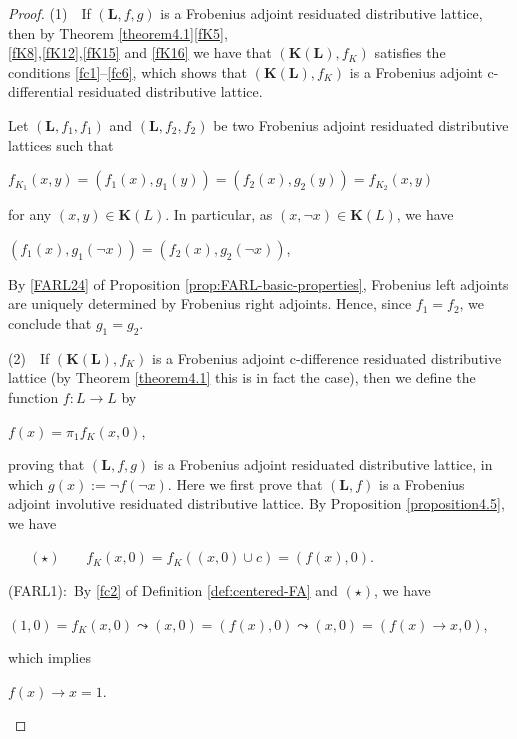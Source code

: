 \documentclass[final,12pt,times]{elsarticle}
\theoremstyle{plain}
\theoremstyle{definition}
\theoremstyle{break}
\begin{document}
\begin{proof}
(1)~~If $(\mathbf{L},f,g)$ is a Frobenius adjoint residuated distributive lattice, then by Theorem \ref{theorem4.1}\ref{fK5},\\\ref{fK8},\ref{fK12},\ref{fK15} and \ref{fK16} we have that  $(\mathbf{K(L)},f_K)$ satisfies the conditions \eqref{fc1}--\eqref{fc6}, which shows that $(\mathbf{K(L)},f_K)$ is a Frobenius adjoint c-differential residuated distributive lattice. 

Let $(\mathbf{L},f_1,f_1)$ and $(\mathbf{L},f_2,f_2)$ be two Frobenius adjoint residuated distributive lattices such that
\begin{center}$f_{K_1}(x,y)=(f_1(x),g_1(y))=(f_2(x),g_2(y))=f_{K_2}(x,y)$
\end{center}
for any $(x,y)\in \mathbf{K}(L)$. In particular, as $(x,{\neg}x)\in \mathbf{K}(L)$, we have
\begin{center}
$(f_1(x),g_1(\neg x))=(f_2(x),g_2(\neg x))$,
\end{center}
By \ref{FARL24} of Proposition \ref{prop:FARL-basic-properties},
Frobenius left adjoints are uniquely determined by Frobenius right adjoints. Hence, since 
$f_1=f_2$, we conclude that $g_1=g_2$.


  (2)~~If $(\mathbf{K(L)},f_K)$ is a Frobenius adjoint c-difference residuated distributive lattice (by Theorem \ref{theorem4.1} this is in fact the case), then we define the function $f:L\rightarrow L$ by
\begin{center} $f(x)=\pi_1f_K(x,0)$,
\end{center}
proving that $(\mathbf{L},f,g)$ is a Frobenius adjoint residuated distributive lattice, in which $g(x):=\neg f(\neg x)$. Here we first prove that $(\mathbf{L},f)$ is a Frobenius adjoint involutive residuated distributive lattice. By Proposition \ref{proposition4.5}, we have
\begin{center}~~~$(\star)$~~~ $f_K(x,0)=f_K((x,0)\cup c)=(f(x),0)$.
\end{center}

(FARL1):\ By \eqref{fc2} of Definition \ref{def:centered-FA} and $(\star)$, we have
\begin{center} $(1,0)=f_K(x,0)\leadsto(x,0)=(f(x),0)\leadsto (x,0)=(f(x)\rightarrow x,0)$,
\end{center}
which implies
\begin{center} $f(x)\rightarrow x=1$.
\end{center}


\end{proof}
\end{document}

